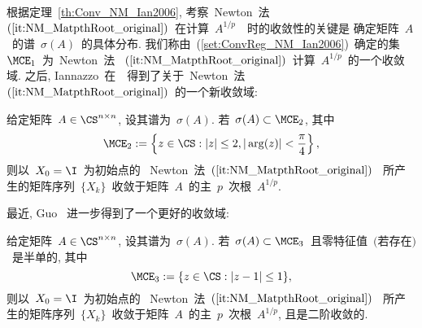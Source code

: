 根据定理~\ref{th:Conv_NM_Ian2006},
考察~Newton~法~$(\ref{it:NM_MatpthRoot_original})$~在计算~$A^{1/p}$~~时的收敛性的关键是
确定矩阵~$A$~的谱~$\sigma(A)$~的具体分布.
我们称由~(\ref{set:ConvReg_NM_Ian2006})~确定的集~$\MCE_1$~为~Newton~法
~$(\ref{it:NM_MatpthRoot_original})$~计算~$A^{1/p}$~的一个收敛域.
之后, Iannazzo~在~\cite{Iannazzo2008}~得到了关于~Newton~法
~$(\ref{it:NM_MatpthRoot_original})$~的一个新收敛域:

\begin{theorem}
\label{th:Conv_NM_Ian2008} 给定矩阵~$A\in\CS^{n\times n}$,
设其谱为~$\sigma(A)$. 若~$\sigma(A) \subset \MCE_2$, 其中
\begin{equation}
\label{set:ConvReg_NM_Ian08} \MCE_2 := \left\{z\in\CS: |z|\leq 2,
|\arg(z)|< \frac{\pi}{4}\right\},
\end{equation}
则以~$X_0 = \I$~为初始点的
~Newton~法~$(\ref{it:NM_MatpthRoot_original})$~
所产生的矩阵序列~$\{X_k\}$~收敛于矩阵~$A$~的主~$p$~次根~$A^{1/p}$.
\end{theorem}

最近, Guo \cite{Guo2010}~进一步得到了一个更好的收敛域:

\begin{theorem}
\label{th:Conv_NM_Guo2010} 给定矩阵~$A\in\CS^{n\times n}$,
设其谱为~$\sigma(A)$. 若~$\sigma(A) \subset
\MCE_3$~且零特征值~$($若存在$)$~是半单的, 其中
\begin{equation}
\label{set:ConvReg_NM_Guo2010} \MCE_3 := \{z\in\CS: |z-1| \leq 1\},
\end{equation}
则以~$X_0 = \I$~为初始点的
~Newton~法~$(\ref{it:NM_MatpthRoot_original})$~
所产生的矩阵序列~$\{X_k\}$~收敛于矩阵~$A$~的主~$p$~次根~$A^{1/p}$,
且是二阶收敛的.
\end{theorem}


